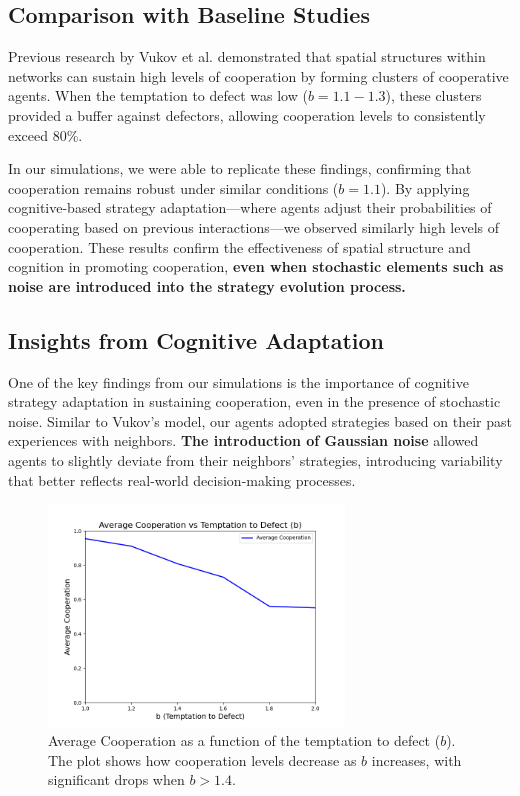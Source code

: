 \documentclass[runningheads]{llncs}
\begin{document}
\subsection{Comparison with Baseline Studies}
Previous research by Vukov et al. demonstrated that spatial structures within networks can sustain high levels of cooperation by forming clusters of cooperative agents. When the temptation to defect was low (\( b = 1.1 - 1.3 \)), these clusters provided a buffer against defectors, allowing cooperation levels to consistently exceed 80\%.

In our simulations, we were able to replicate these findings, confirming that cooperation remains robust under similar conditions (\( b = 1.1 \)). By applying cognitive-based strategy adaptation—where agents adjust their probabilities of cooperating based on previous interactions—we observed similarly high levels of cooperation. These results confirm the effectiveness of spatial structure and cognition in promoting cooperation, \textbf{even when stochastic elements such as noise are introduced into the strategy evolution process.}

\subsection{Insights from Cognitive Adaptation}
One of the key findings from our simulations is the importance of cognitive strategy adaptation in sustaining cooperation, even in the presence of stochastic noise. Similar to Vukov's model, our agents adopted strategies based on their past experiences with neighbors. \textbf{The introduction of Gaussian noise} allowed agents to slightly deviate from their neighbors' strategies, introducing variability that better reflects real-world decision-making processes.

\begin{figure}[htbp]
    \centering
    \includegraphics[width=0.7\textwidth]{cooperation_vs_b.png}
    \caption{Average Cooperation as a function of the temptation to defect (\( b \)). The plot shows how cooperation levels decrease as \( b \) increases, with significant drops when \( b > 1.4 \).}
    \label{fig:coop_vs_b}
\end{figure}
\end{document}
